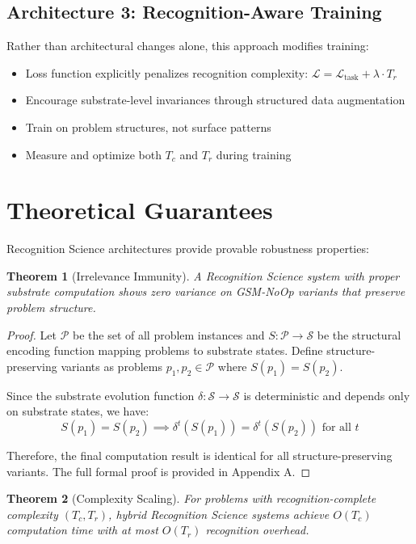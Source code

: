\documentclass[11pt,letterpaper]{article}
\theoremstyle{plain}
\newtheorem{theorem}{Theorem}
\theoremstyle{definition}
\theoremstyle{remark}
\begin{document}
\subsection{Architecture 3: Recognition-Aware Training}

Rather than architectural changes alone, this approach modifies training:
\begin{itemize}
\item Loss function explicitly penalizes recognition complexity: $\mathcal{L} = \mathcal{L}_{\text{task}} + \lambda \cdot T_r$
\item Encourage substrate-level invariances through structured data augmentation
\item Train on problem structures, not surface patterns
\item Measure and optimize both $T_c$ and $T_r$ during training
\end{itemize}

\section{Theoretical Guarantees}
\label{sec:guarantees}

Recognition Science architectures provide provable robustness properties:

\begin{theorem}[Irrelevance Immunity]
A Recognition Science system with proper substrate computation shows zero variance on GSM-NoOp variants that preserve problem structure.
\end{theorem}

\begin{proof}
Let $\mathcal{P}$ be the set of all problem instances and $S: \mathcal{P} \rightarrow \mathcal{S}$ be the structural encoding function mapping problems to substrate states. Define structure-preserving variants as problems $p_1, p_2 \in \mathcal{P}$ where $S(p_1) = S(p_2)$.

Since the substrate evolution function $\delta: \mathcal{S} \rightarrow \mathcal{S}$ is deterministic and depends only on substrate states, we have:
\[S(p_1) = S(p_2) \implies \delta^t(S(p_1)) = \delta^t(S(p_2)) \text{ for all } t\]

Therefore, the final computation result is identical for all structure-preserving variants. The full formal proof is provided in Appendix A.
\end{proof}

\begin{theorem}[Complexity Scaling]
For problems with recognition-complete complexity $(T_c, T_r)$, hybrid Recognition Science systems achieve $O(T_c)$ computation time with at most $O(T_r)$ recognition overhead.
\end{theorem}
\end{document}
